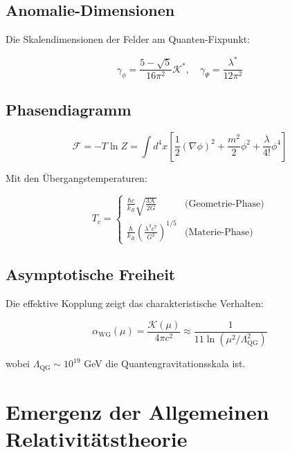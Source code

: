 \subsection{Anomalie-Dimensionen}

Die Skalendimensionen der Felder am Quanten-Fixpunkt:

\begin{equation}
\gamma_\phi = \frac{5-\sqrt{5}}{16\pi^2}\mathcal{K}^*, \quad \gamma_\Psi = \frac{\lambda^*}{12\pi^2}
\end{equation}

\subsection{Phasendiagramm}

\begin{equation}
\mathcal{F} = -T \ln Z = \int d^4x \left[ \frac{1}{2}(\nabla \phi)^2 + \frac{m^2}{2}\phi^2 + \frac{\lambda}{4!}\phi^4 \right]
\end{equation}

Mit den Übergangstemperaturen:

\begin{equation}
T_c = \begin{cases}
\frac{\hbar c}{k_B}\sqrt{\frac{3\mathcal{K}}{2G}} & \text{(Geometrie-Phase)} \\
\frac{\hbar}{k_B}\left(\frac{\lambda^3c^7}{G^2}\right)^{1/5} & \text{(Materie-Phase)}
\end{cases}
\end{equation}

\subsection{Asymptotische Freiheit}

Die effektive Kopplung zeigt das charakteristische Verhalten:

\begin{equation}
\alpha_{\text{WG}}(\mu) = \frac{\mathcal{K}(\mu)}{4\pi c^2} \approx \frac{1}{11\ln(\mu^2/\Lambda^2_{\text{QG}})}
\end{equation}

wobei $\Lambda_{\text{QG}} \sim 10^{19}$ GeV die Quantengravitationsskala ist.

\section{Emergenz der Allgemeinen Relativitätstheorie}
\label{sec:emergenz_art}

